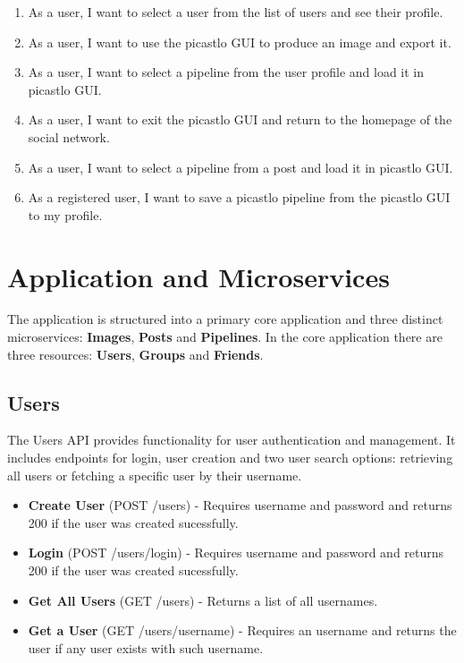 \documentclass[acmart, nonacm]{acmart}
\begin{document}
\begin{enumerate}
    \item As a user, I want to select a user from the list of users and see their profile.
    \item As a user, I want to use the picastlo GUI to produce an image and export it.
    \item As a user, I want to select a pipeline from the user profile and load it in picastlo GUI.
    \item As a user, I want to exit the picastlo GUI and return to the homepage of the social network.
    \item As a user, I want to select a pipeline from a post and load it in picastlo GUI.
    \item As a registered user, I want to save a picastlo pipeline from the picastlo GUI to my profile.
\end{enumerate}

\section{Application and Microservices}
The application is structured into a primary core application and three distinct microservices: \textbf{Images}, \textbf{Posts} and \textbf{Pipelines}.
In the core application there are three resources: \textbf{Users}, \textbf{Groups} and \textbf{Friends}.

\subsection{Users}
The Users API provides functionality for user authentication and management. It includes endpoints for login, user creation and two user search options: retrieving all users or fetching a 
specific user by their username.
\begin{itemize}
    \item \textbf{Create User} (POST /users) - Requires username and password and returns 200 if the user was created sucessfully.
    \item \textbf{Login} (POST /users/login) - Requires username and password and returns 200 if the user was created sucessfully.
    \item \textbf{Get All Users} (GET /users) - Returns a list of all usernames.
    \item \textbf{Get a User} (GET /users/{username}) - Requires an username and returns the user if any user exists with such username.
\end{itemize}
\end{document}

